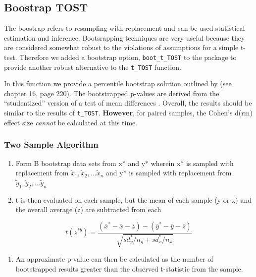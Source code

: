 \documentclass[]{interact}
\theoremstyle{plain}%
\theoremstyle{definition}
\theoremstyle{remark}
\providecommand{\tightlist}{%
  \setlength{\itemsep}{0pt}\setlength{\parskip}{0pt}}
\def\tightlist{}
\begin{document}
\hypertarget{boostrap-tost}{%
\subsection{Boostrap TOST}\label{boostrap-tost}}

The boostrap refers to resampling with replacement and can be used
statistical estimation and inference. Bootsrapping techniques are very
useful because they are considered somewhat robust to the violations of
assumptions for a simple t-test. Therefore we added a bootstrap option,
\texttt{boot\_t\_TOST} to the package to provide another robust
alternative to the \texttt{t\_TOST} function.

In this function we provide a percentile bootstrap solution outlined by
\citet{efron93} (see chapter 16, page 220). The bootstrapped p-values
are derived from the ``studentized'' version of a test of mean
differences \citep{efron93}. Overall, the results should be similar to
the results of \texttt{t\_TOST}. \textbf{However}, for paired samples,
the Cohen's d(rm) effect size \emph{cannot} be calculated at this time.

\hypertarget{two-sample-algorithm}{%
\subsubsection{Two Sample Algorithm}\label{two-sample-algorithm}}

\begin{enumerate}
\def\labelenumi{\arabic{enumi}.}
\item
  Form B bootstrap data sets from x* and y* wherein x* is sampled with
  replacement from \(\tilde x_1,\tilde x_2, ... \tilde x_n\) and y* is
  sampled with replacement from
  \(\tilde y_1,\tilde y_2, ... \tilde y_n\)
\item
  t is then evaluated on each sample, but the mean of each sample (y or
  x) and the overall average (z) are subtracted from each
\end{enumerate}

\[
t(z^{*b}) = \frac {(\bar x^*-\bar x - \bar z) - (\bar y^*-\bar y - \bar z)}{\sqrt {sd_y^*/n_y + sd_x^*/n_x}}
\]

\begin{enumerate}
\def\labelenumi{\arabic{enumi}.}
\setcounter{enumi}{2}
\tightlist
\item
  An approximate p-value can then be calculated as the number of
  bootstrapped results greater than the observed t-statistic from the
  sample.
\end{enumerate}
\end{document}
